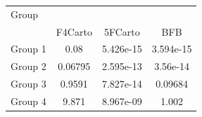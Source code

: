 \begin{tabular}{lccc}
\toprule
Group &  \\
\cmidrule(lr){2-4}
     & F4Carto & 5FCarto & BFB \\
\midrule

Group 1 &     0.08 & 5.426e-15 &   3.594e-15 \\
Group 2 &  0.06795 & 2.595e-13 &    3.56e-14 \\
Group 3 &   0.9591 & 7.827e-14 &     0.09684 \\
Group 4 &    9.871 & 8.967e-09 &       1.002 \\
\bottomrule
\end{tabular}
